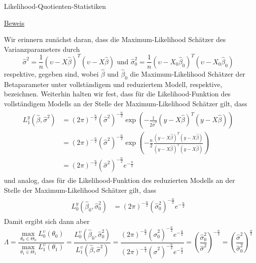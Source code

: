 \documentclass[
  8pt,
  ignorenonframetext,
]{beamer}
\begin{document}
\begin{frame}{Likelihood-Quotienten-Statistiken}
\protect\hypertarget{likelihood-quotienten-statistiken-4}{}
\footnotesize

\underline{Beweis}

Wir erinnern zunächst daran, dass die Maximum-Likelihood Schätzer des
Varianzparameters durch \begin{equation}
\hat{\sigma}^2 = \frac{1}{n}\left(\upsilon - X\hat{\beta}\right)^T\left(\upsilon - X\hat{\beta}\right)
\mbox{ und }
\hat{\sigma}^2_0 = \frac{1}{n}\left(\upsilon - X_0\hat{\beta}_0\right)^T\left(\upsilon - X_0\hat{\beta}_0\right)
\end{equation} respektive, gegeben sind, wobei \(\hat{\beta}\) und
\(\hat{\beta}_0\) die Maximum-Likelihood Schätzer der Betaparameter
unter vollständigem und reduziertem Modell, respektive, bezeichnen.
Weiterhin halten wir fest, dass für die Likelihood-Funktion des
vollständigem Modells an der Stelle der Maximum-Likelihood Schätzer
gilt, dass \begin{align}
\begin{split}
L^y_1(\hat{\beta}, \hat{\sigma}^2)
& = (2\pi)^{-\frac{n}{2}}(\hat{\sigma}^2)^{-\frac{n}{2}}\exp\left(-\frac{1}{2\hat{\sigma}^2}(y - X\hat{\beta})^T(y - X\hat{\beta})\right) \\
& = (2\pi)^{-\frac{n}{2}}(\hat{\sigma}^2)^{-\frac{n}{2}}\exp\left(-\frac{n}{2}\frac{(y - X\hat{\beta})^T(y - X\hat{\beta})}{(y - X\hat{\beta})^T(y - X\hat{\beta})}\right) \\
& = (2\pi)^{-\frac{n}{2}}(\hat{\sigma}^2)^{-\frac{n}{2}}e^{-\frac{n}{2}}
\end{split}
\end{align} und analog, dass für die Likelihood-Funktion des reduzierten
Modells an der Stelle der Maximum-Likelihood Schätzer gilt, dass
\begin{align}
\begin{split}
L^y_0(\hat{\beta}_0, \hat{\sigma}^2_0)
& = (2\pi)^{-\frac{n}{2}}(\hat{\sigma}^2_0)^{-\frac{n}{2}}e^{-\frac{n}{2}}
\end{split}
\end{align} Damit ergibt sich dann aber \begin{equation*}
\Lambda 
= \frac{\max_{\theta_0 \in \Theta_0}L^\upsilon_0(\theta_0)}{\max_{\theta_1 \in \Theta_1}L^\upsilon_1(\theta_1)} 
= \frac{L^\upsilon_0(\hat{\beta}_0, \hat{\sigma}_0^2)}{L^\upsilon_1(\hat{\beta}, \hat{\sigma}^2)}
= \frac{(2\pi)^{-\frac{n}{2}}(\hat{\sigma}^2_0)^{-\frac{n}{2}}e^{-\frac{n}{2}}}{(2\pi)^{-\frac{n}{2}}(\hat{\sigma}^2)^{-\frac{n}{2}}e^{-\frac{n}{2}}}
= \left(\frac{\hat{\sigma}^2_0}{\hat{\sigma}^2}\right)^{-\frac{n}{2}}
= \left(\frac{\hat{\sigma}^2}{\hat{\sigma}^2_0}\right)^{\frac{n}{2}}
\end{equation*}
\end{frame}
\end{document}
